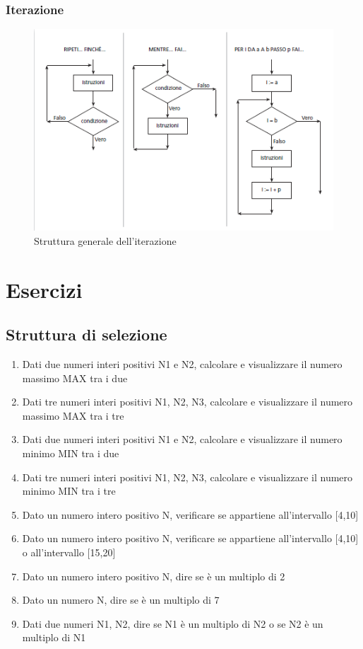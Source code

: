 \documentclass{article}
\begin{document}
	\subsubsection{Iterazione}
	\begin{figure}[h!]
		\centering
		\includegraphics[scale=1]{Iterazione.png}
		\caption{Struttura generale dell'iterazione}
	\end{figure}



	\pagebreak
	
	\section{Esercizi}
	\subsection{Struttura di selezione}
	\begin{enumerate}
		\item Dati due numeri interi positivi N1 e N2, calcolare e visualizzare il numero massimo MAX tra i due
		\item Dati tre numeri interi positivi N1, N2, N3, calcolare e visualizzare il numero massimo MAX tra i tre
		\item Dati due numeri interi positivi N1 e N2, calcolare e visualizzare il numero minimo MIN tra i due
		\item Dati tre numeri interi positivi N1, N2, N3, calcolare e visualizzare il numero minimo MIN tra i tre
		\item Dato un numero intero positivo N, verificare se appartiene all'intervallo [4,10]
		\item Dato un numero intero positivo N, verificare se appartiene all'intervallo [4,10] o all'intervallo [15,20]
		\item Dato un numero intero positivo N, dire se è un multiplo di 2
		\item Dato un numero N, dire se è un multiplo di 7
		\item Dati due numeri N1, N2, dire se N1 è un multiplo di N2 o se N2 è un multiplo di N1
	\end{enumerate}
\end{document}
